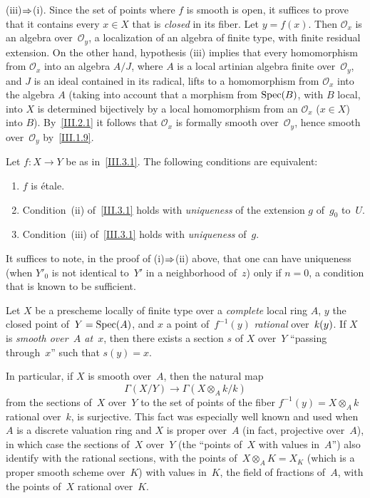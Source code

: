 (iii)$\To$(i). Since the set of points where $f$ is smooth is open, it
suffices to prove that it contains every $x \in X$ that is
\emph{closed} in its fiber. Let $y = f(x)$. Then $\mathcal{O}_x$ is an
algebra over~$\mathcal{O}_y$, a localization of an algebra of finite
type, with finite residual extension. On the other hand, hypothesis
(iii) implies that every homomorphism from $\mathcal{O}_x$ into an
algebra $A/J$, where $A$ is a local artinian algebra finite
over~$\mathcal{O}_y$, and $J$ is an ideal contained in its radical, lifts
to a homomorphism from $\mathcal{O}_x$ into the algebra $A$ (taking
into account that a morphism from $\operatorname{Spec}(B)$, with $B$ local, into
$X$ is determined bijectively by a local homomorphism from an
$\mathcal{O}_x$ ($x \in X$) into $B$). By~\ref{III.2.1} it follows that
$\mathcal{O}_x$ is formally smooth over~$\mathcal{O}_y$, hence smooth
over~$\mathcal{O}_y$ by~\ref{III.1.9}.

\begin{corollary}
\label{III.3.2}
Let $f\colon X\to Y$ be as in~\ref{III.3.1}. The following conditions
are equivalent:
\begin{enumerate}
\item[(i)] $f$ is \'etale.
\item[(ii)] Condition~\textup{(ii)} of~\ref{III.3.1} holds with
{\emph{uniqueness}} of the extension $g$ of~$g_0$ to~$U$.
\item[(iii)] Condition~\textup{(iii)} of~\ref{III.3.1} holds with
{\emph{uniqueness}} of~$g$.
\end{enumerate}
\end{corollary}

It suffices to note, in the proof of (i)$\To$(ii) above, that one can
have uniqueness (when $Y'_0$ is not identical to~$Y'$ in a neighborhood
of~$z$) only if $n=0$, a condition that is known to be sufficient.

\begin{corollary}
\label{III.3.3}
Let $X$ be a prescheme locally of finite type over a {\emph{complete}}
local ring $A$, $y$ the closed point of~$Y=\operatorname{Spec}(A)$, and $x$ a
point of~$f^{-1}(y)$ {\emph{rational}} over~$\mathit{k}(y)$. If $X$ is
{\emph{smooth over~$A$ at~$x$}}, then there exists a section $s$ of
$X$ over~$Y$ ``passing through~$x$'' \ie such that $s(y)=x$.
\end{corollary}

In particular, if $X$ is smooth over~$A$, then the natural map
$$
\Gamma(X/Y)\to\Gamma(X\otimes_A k/k)
$$
from the sections of~$X$ over~$Y$ to the set of points of the fiber
$f^{-1}(y)=X\otimes_A k$ rational over~$k$, is surjective. This fact
was especially well known and used when $A$ is a discrete valuation
ring and $X$ is proper over~$A$ (in fact, projective over~$A$), in
which case the sections of~$X$ over~$Y$ (\ie the ``points of~$X$ with
values in~$A$'') also identify with the rational sections, \ie with the
points of~$X\otimes_A K=X_K$ (which is a proper smooth scheme over~$K$)
with values in~$K$, the field of fractions of~$A$, \ie with the points
of~$X$ rational over~$K$.
